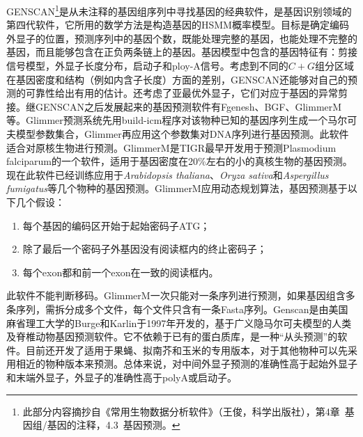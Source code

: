 \documentclass[11pt,a4paper,twoside]{book}
\begin{document}
GENSCAN\footnote{此部分内容摘抄自《常用生物数据分析软件》（王俊，科学出版社），第4章\ 基因组/基因的注释，4.3\ 基因预测。}是从未注释的基因组序列中寻找基因的经典软件，是基因识别领域的第四代软件，它所用的数学方法是构造基因的HSMM概率模型。目标是确定编码外显子的位置，预测序列中的基因个数，既能处理完整的基因，也能处理不完整的基因，而且能够包含在正负两条链上的基因。基因模型中包含的基因特征有：剪接信号模型，外显子长度分布，启动子和ploy-A信号。考虑到不同的$C+G$组分区域在基因密度和结构（例如内含子长度）方面的差别，GENSCAN还能够对自己的预测的可靠性给出有用的估计。还考虑了亚最优外显子，它们对应于基因的异常剪接。继GENSCAN之后发展起来的基因预测软件有Fgenesh、BGF、GlimmerM等。Glimmer预测系统先用build-icm程序对该物种已知的基因序列生成一个马尔可夫模型参数集合，Glimmer再应用这个参数集对DNA序列进行基因预测。此软件适合对原核生物进行预测。GlimmerM是TIGR最早开发用于预测Plasmodium falciparum的一个软件，适用于基因密度在20\%左右的小的真核生物的基因预测。现在此软件已经训练应用于\textit{Arabidopsis thaliana}、\textit{Oryza sativa}和\textit{Aspergillus fumigatus}等几个物种的基因预测。GlimmerM应用动态规划算法，基因预测基于以下几个假设：
\begin{enumerate}
  \item 每个基因的编码区开始于起始密码子ATG；
  \item 除了最后一个密码子外基因没有阅读框内的终止密码子；
  \item 每个exon都和前一个exon在一致的阅读框内。
\end{enumerate}
此软件不能判断移码。GlimmerM一次只能对一条序列进行预测，如果基因组含多条序列，需拆分成多个文件，每个文件只含有一条Fasta序列。Genscan是由美国麻省理工大学的Burge和Karlin于1997年开发的，基于广义隐马尔可夫模型的人类及脊椎动物基因预测软件。它不依赖于已有的蛋白质库，是一种“从头预测”的软件。目前还开发了适用于果蝇、拟南芥和玉米的专用版本，对于其他物种可以先采用相近的物种版本来预测。总体来说，对中间外显子预测的准确性高于起始外显子和末端外显子，外显子的准确性高于polyA或启动子。
\end{document}
